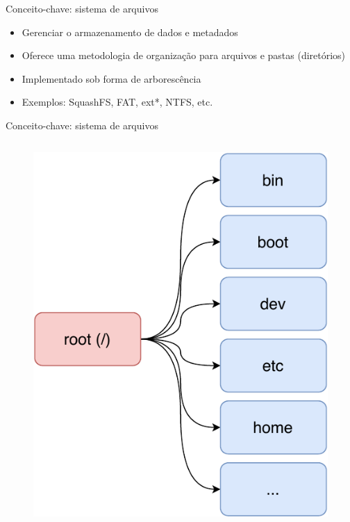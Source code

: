 \begin{frame}{Conceito-chave: sistema de arquivos}
    
    \begin{itemize}
        \item Gerenciar o armazenamento de dados e metadados
        \item Oferece uma metodologia de organização para arquivos e pastas (diretórios)
        \item Implementado sob forma de arborescência
        \item Exemplos: SquashFS, FAT, ext*, NTFS, etc.
    \end{itemize}
    
\end{frame}

\begin{frame}{Conceito-chave: sistema de arquivos}
    \begin{columns}
    \begin{column}{0.5\textwidth}
    \begin{figure}
        \centering
        \includegraphics[scale=0.4]{figuras/FHS.pdf}

\end{figure}
\end{column}
\end{columns}
\end{frame}
